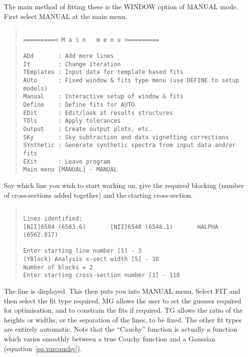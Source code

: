 The main method of fitting these is the WINDOW option of MANUAL mode.
First select MANUAL at the main menu.
\begin{quote}\begin{verbatim}
 
=========< M a i n   m e n u >=========
 
ADd       : Add more lines
It        : Change iteration
TEmplates : Input data for template based fits
AUto      : Fixed window & fits type menu (use DEFINE to setup models)
Manual    : Interactive setup of window & fits
Define    : Define fits for AUTO
EDit      : Edit/look at results structures
TOls      : Apply tolerances
Output    : Create output plots, etc.
SKy       : Sky subtraction and data vignetting corrections
SYnthetic : Generate synthetic spectra from input data and/or fits
EXit      : Leave program
Main menu [MANUAL] - MANUAL
\end{verbatim}\end{quote}
Say which line you wish to start working on, give the required blocking
(number of cross-sections added together) and the starting
cross-section.
\begin{quote}\begin{verbatim}
 
Lines identified:
[NII]6584 (6583.6)       [NII]6548 (6548.1)       HALPHA (6562.817)
 
Enter starting line number [1] - 3
(YBlock) Analysis x-sect width [5] - 10
Number of blocks = 2
Enter starting cross-section number [1] - 110
\end{verbatim}\end{quote}
The line is displayed.
This then puts you into MANUAL menu. Select FIT and then select the fit
type required.
MG allows the user to set the guesses required for
optimisation, and to constrain the fits if required. TG allows the
ratio of the heights or widths, or the separation of the lines, to be
fixed. The other fit types are entirely automatic. Note that the
``Cauchy'' function is actually a function which varies smoothly
between a true Cauchy function and a Gaussian
(equation~\ref{eq.varcauchy}).

